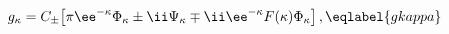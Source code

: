 \begin{equation}
g_\kappa = C_\pm \bigl[\pi\ee^{-\kappa}\Phi_\kappa
\pm\ii\Psi_\kappa \mp\ii \ee^{-\kappa} F(\kappa)\Phi_\kappa\bigr] \,,
\eqlabel{gkappa}
\end{equation}

